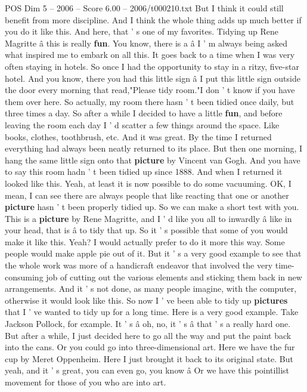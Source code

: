 \begin{textsample}{POS Dim 5 – 2006 – Score 6.00 – 2006/t000210.txt}
But I think it could still benefit from more discipline.
And I think the whole thing adds up much better if you do it like this.
And here, that ' s one of my favorites.
Tidying up Rene Magritte â this is really \textbf{fun}.
You know, there is a â I ' m always being asked what inspired me to embark on all this.
It goes back to a time when I was very often staying in hotels.
So once I had the opportunity to stay in a ritzy, five-star hotel.
And you know, there you had this little sign â I put this little sign outside the door every morning that read,"Please tidy room."I don ' t know if you have them over here.
So actually, my room there hasn ' t been tidied once daily, but three times a day.
So after a while I decided to have a little \textbf{fun}, and before leaving the room each day I ' d scatter a few things around the space.
Like books, clothes, toothbrush, etc.
And it was great.
By the time I returned everything had always been neatly returned to its place.
But then one morning, I hang the same little sign onto that \textbf{picture} by Vincent van Gogh.
And you have to say this room hadn ' t been tidied up since 1888.
And when I returned it looked like this.
Yeah, at least it is now possible to do some vacuuming.
OK, I mean, I can see there are always people that like reacting that one or another \textbf{picture} hasn ' t been properly tidied up.
So we can make a short test with you.
This is a \textbf{picture} by Rene Magritte, and I ' d like you all to inwardly â like in your head, that is â to tidy that up.
So it ' s possible that some of you would make it like this.
Yeah?
I would actually prefer to do it more this way.
Some people would make apple pie out of it.
But it ' s a very good example to see that the whole work was more of a handicraft endeavor that involved the very time-consuming job of cutting out the various elements and sticking them back in new arrangements.
And it ' s not done, as many people imagine, with the computer, otherwise it would look like this.
So now I ' ve been able to tidy up \textbf{pictures} that I ' ve wanted to tidy up for a long time.
Here is a very good example.
Take Jackson Pollock, for example.
It ' s â oh, no, it ' s â that ' s a really hard one.
But after a while, I just decided here to go all the way and put the paint back into the cans.
Or you could go into three-dimensional art.
Here we have the fur cup by Meret Oppenheim.
Here I just brought it back to its original state.
But yeah, and it ' s great, you can even go, you know â Or we have this pointillist movement for those of you who are into art.

\end{textsample}
